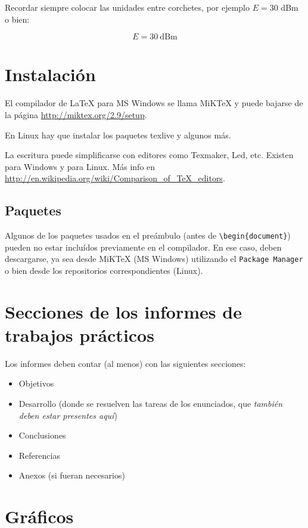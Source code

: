 \documentclass{article}
\begin{document}
Recordar siempre colocar las unidades entre corchetes, por ejemplo $E = 30$ dBm o bien:

\[
E = 30 \ \mbox{dBm}				%
\]

\section{Instalación}

El compilador de \LaTeX{} para MS Windows se llama MiKTeX y puede bajarse de la página \url{http://miktex.org/2.9/setup}.

En Linux hay que instalar los paquetes texlive y algunos más.

La escritura puede simplificarse con editores como Texmaker, Led, etc. Existen para Windows y para Linux. Más info en \url{http://en.wikipedia.org/wiki/Comparison_of_TeX_editors}.

\subsection{Paquetes}

Algunos de los paquetes usados en el preámbulo (antes de \verb|\begin{document}|) pueden no estar incluídos previamente en el compilador. En ese caso, deben descargarse, ya sea desde MiKTeX (MS Windows) utilizando el \texttt{Package Manager} o bien desde los repositorios correspondientes (Linux).

\section{Secciones de los informes de trabajos prácticos}

Los informes deben contar (al menos) con las siguientes secciones:

\begin{itemize}
 \item Objetivos
 \item Desarrollo (donde se resuelven las tareas de los enunciados, que \emph{también deben estar presentes aquí})
 \item Conclusiones
 \item Referencias
 \item Anexos (si fueran necesarios)
\end{itemize}

\section{Gráficos}
\end{document}
